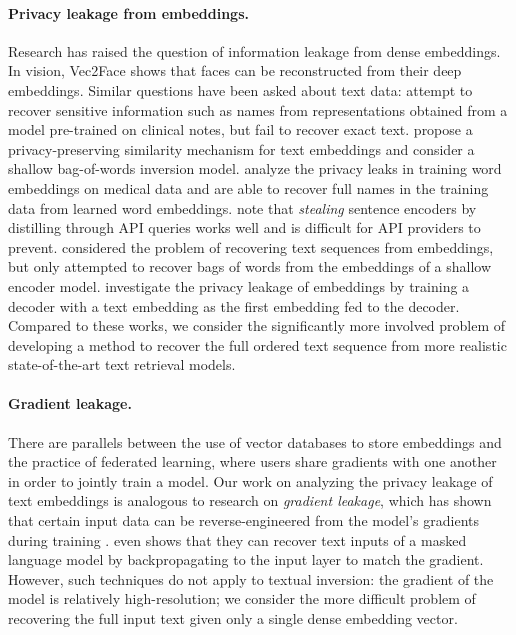 \documentclass[11pt]{article}
\begin{document}
\paragraph{Privacy leakage from embeddings.} Research has raised the question of information leakage from dense embeddings. In vision, Vec2Face \cite{duong2020vec2face} shows that faces can be reconstructed from their deep embeddings. Similar questions have been asked about text data:
\citet{lehman2021does} attempt to recover sensitive information such as names from representations obtained from a model pre-trained on clinical notes, but fail to recover exact text. \citet{kim2022towardhomomorphic} propose a privacy-preserving similarity mechanism for text embeddings and consider a shallow bag-of-words inversion model. \citet{abdalla2020wordembeddingprivacy} analyze the privacy leaks in training word embeddings on medical data and are able to recover full names in the training data from learned word embeddings. \citet{dziedzic2023sentence} note that \textit{stealing} sentence encoders by distilling through API queries works well and is difficult for API providers to prevent. \citet{song2020informationleakage} considered the problem of recovering text sequences from embeddings, but only attempted to recover bags of words from the embeddings of a shallow encoder model. \citet{li2023sentence} investigate the privacy leakage of embeddings by training a decoder with a text embedding as the first embedding fed to the decoder. Compared to these works, we consider the significantly more involved problem of developing a method to recover the full ordered text sequence from more realistic state-of-the-art text retrieval models.

\paragraph{Gradient leakage.}
There are parallels between the use of vector databases to store embeddings and the practice of federated learning, where users share gradients with one another in order to jointly train a model. Our work on analyzing the privacy leakage of text embeddings is analogous to research on \textit{gradient leakage}, which has shown that certain input data can be reverse-engineered from the model's gradients during training \cite{melis2018exploiting,zhu2019deepgradientleakage,zhao2020idlg,geiping2020inverting}.
\citet{zhu2019deepgradientleakage} even shows that they can recover text inputs of a masked language model by backpropagating to the input layer to match the gradient. However, such techniques do not apply to textual inversion: the gradient of the model is relatively high-resolution; we consider the more difficult problem of recovering the full input text given only a single dense embedding vector.
\end{document}
